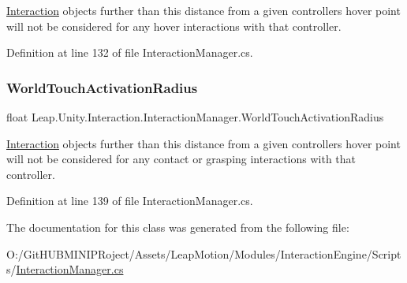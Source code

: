 \mbox{\hyperlink{namespace_leap_1_1_unity_1_1_interaction}{Interaction}} objects further than this distance from a given controller\textquotesingle{}s hover point will not be considered for any hover interactions with that controller. 



Definition at line 132 of file Interaction\+Manager.\+cs.

\mbox{\label{class_leap_1_1_unity_1_1_interaction_1_1_interaction_manager_af4c1780a031a91b3dac0846a5577be26}} 
\subsubsection{\texorpdfstring{WorldTouchActivationRadius}{WorldTouchActivationRadius}}
{\footnotesize\ttfamily float Leap.\+Unity.\+Interaction.\+Interaction\+Manager.\+World\+Touch\+Activation\+Radius\hspace{0.3cm}{\ttfamily [get]}}



\mbox{\hyperlink{namespace_leap_1_1_unity_1_1_interaction}{Interaction}} objects further than this distance from a given controller\textquotesingle{}s hover point will not be considered for any contact or grasping interactions with that controller. 



Definition at line 139 of file Interaction\+Manager.\+cs.



The documentation for this class was generated from the following file\+:\begin{DoxyCompactItemize}
\item 
O\+:/\+Git\+H\+U\+B\+M\+I\+N\+I\+P\+Roject/\+Assets/\+Leap\+Motion/\+Modules/\+Interaction\+Engine/\+Scripts/\mbox{\hyperlink{_interaction_manager_8cs}{Interaction\+Manager.\+cs}}\end{DoxyCompactItemize}
